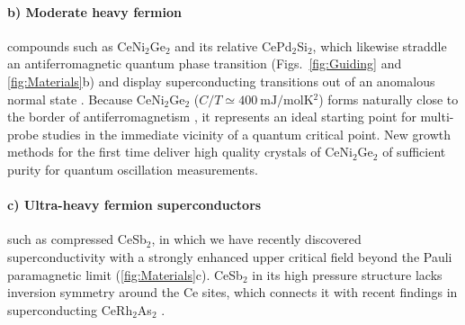 \paragraph{b) Moderate heavy fermion} compounds such as CeNi$_2$Ge$_2$ and its relative CePd$_2$Si$_2$, which likewise straddle an antiferromagnetic quantum phase transition (Figs.~\ref{fig:Guiding} and \ref{fig:Materials}b) and display superconducting transitions out of an anomalous normal state . %
Because CeNi$_2$Ge$_2$ ($C/T\simeq \SI{400}{\milli\joule/\mol\kelvin^2}$) forms naturally close to the border of antiferromagnetism %
, it represents an ideal starting point for multi-probe studies in the immediate vicinity of a quantum critical point.
New growth methods  for the first time deliver high quality crystals of CeNi$_2$Ge$_2$ of sufficient purity for quantum oscillation measurements.


\paragraph{c) Ultra-heavy fermion superconductors} such as compressed CeSb$_2$, in which we have recently discovered superconductivity with a strongly enhanced upper critical field beyond the Pauli paramagnetic limit %
(\autoref{fig:Materials}c). CeSb$_2$ in its high pressure structure lacks  inversion symmetry around the Ce sites, which connects it with recent findings in superconducting CeRh$_2$As$_2$ \cite{khim21}.

